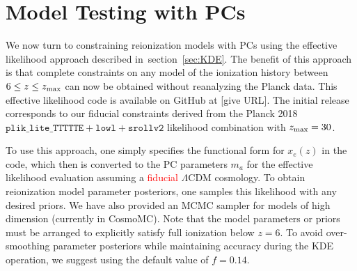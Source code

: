 \documentclass[prd,twocolumn,amsmath,amssymb,floatfix,superscriptaddress,nofootinbib]{revtex4-1}
\newcommand{\refsec}[1]{section~\ref{sec:#1}}
\newcommand{\zmax}{z_{\rm max}}
\newcommand{\wh}[1]{\textcolor{blue}{#1}}
\newcommand{\ch}[1]{\textcolor{red}{#1}}
\begin{document}


\section{Model Testing with PCs}
\label{sec:effective_likelihood}

We now turn to constraining reionization models with PCs using the
effective likelihood approach described in~\refsec{KDE}.  The benefit of this approach is that
complete constraints on any model of the ionization history  between $6 \leq z \leq \zmax$ can now be obtained without reanalyzing the Planck data. 
This effective likelihood code is available on GitHub at \url{} [give URL]. The initial release corresponds to our fiducial constraints derived from the Planck 2018 $\texttt{plik\_lite\_TTTTTE} + \texttt{lowl} + \texttt{srollv2}$ likelihood combination with $\zmax = 30$. 

To use this approach, one simply specifies the functional form for $x_e(z)$ in the code, which then is converted to the PC parameters $m_a$ for the effective likelihood evaluation assuming a \ch{fiducial} $\Lambda$CDM cosmology.   
To obtain reionization model parameter posteriors, one samples this likelihood with any desired priors.   
We have also provided an MCMC sampler for models of high dimension (currently in CosmoMC). Note that the model parameters or priors must be arranged to explicitly satisfy 
full ionization below $z=6$. To avoid over-smoothing parameter posteriors while maintaining accuracy during the KDE operation, we suggest using the default value of $f = 0.14$.
\end{document}
